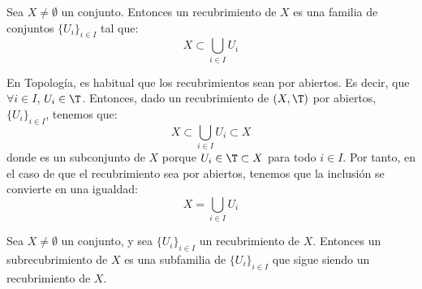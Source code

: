 \begin{definicion}[Recubrimiento]
    Sea $X\neq \emptyset$ un conjunto. Entonces un recubrimiento de $X$ es una familia de conjuntos $\{U_i\}_{i\in I}$ tal que:
    \begin{equation*}
        X\subset \bigcup_{i\in I} U_i
    \end{equation*}
\end{definicion}
\begin{observacion}
    En Topología, es habitual que los recubrimientos sean por abiertos. Es decir, que $\forall i\in I$, $U_i\in \T$.
    Entonces, dado un recubrimiento de $(X,\T)$ por abiertos, $\{U_i\}_{i\in I}$, tenemos que:
    \begin{equation*}
        X\subset \bigcup_{i\in I} U_i \subset X
    \end{equation*}
    donde es un subconjunto de $X$ porque $U_i\in \T\subset X$ para todo $i\in I$. Por tanto, en el caso de que el recubrimiento sea por abiertos, tenemos que la inclusión se convierte en una igualdad:
    \begin{equation*}
        X= \bigcup_{i\in I} U_i
    \end{equation*}
\end{observacion}

\begin{definicion}[subrecubrimiento]
    Sea $X\neq \emptyset$ un conjunto, y sea $\{U_i\}_{i\in I}$ un recubrimiento de $X$. Entonces un subrecubrimiento de $X$ es una subfamilia de $\{U_i\}_{i\in I}$ que sigue siendo un recubrimiento de $X$.
\end{definicion}


